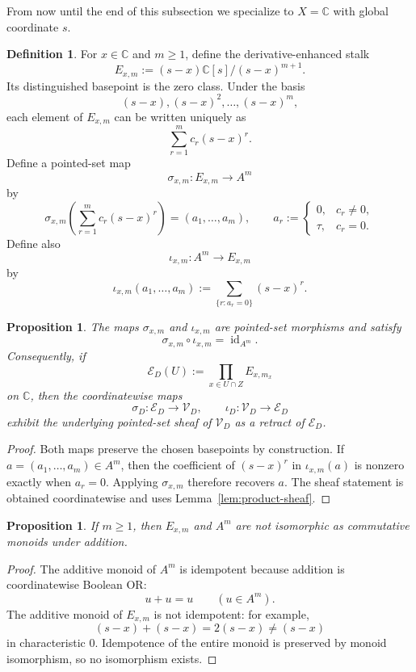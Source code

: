 \documentclass[11pt,a4paper]{article}
\newtheorem{proposition}[theorem]{Proposition}
\theoremstyle{definition}
\newtheorem{definition}[theorem]{Definition}
\theoremstyle{remark}
\newcommand{\CC}{\mathbb C}
\newcommand{\cV}{\mathcal V}
\newcommand{\cE}{\mathcal E}
\newcommand{\taup}{\tau}
\begin{document}
From now until the end of this subsection we specialize to $X=\CC$ with global coordinate $s$.

\begin{definition}
For $x\in\CC$ and $m\ge1$, define the derivative-enhanced stalk
\[
E_{x,m}:=(s-x)\CC[s]/(s-x)^{m+1}.
\]
Its distinguished basepoint is the zero class.  Under the basis
\[
(s-x),(s-x)^2,\dots,(s-x)^m,
\]
each element of $E_{x,m}$ can be written uniquely as
\[
\sum_{r=1}^m c_r(s-x)^r.
\]
Define a pointed-set map
\[
\sigma_{x,m}:E_{x,m}\to A^m
\]
by
\[
\sigma_{x,m}\!\left(\sum_{r=1}^m c_r(s-x)^r\right)=(a_1,\dots,a_m),
\qquad
 a_r:=\begin{cases}0,& c_r\neq0,\\ \taup,& c_r=0.\end{cases}
\]
Define also
\[
\iota_{x,m}:A^m\to E_{x,m}
\]
by
\[
\iota_{x,m}(a_1,\dots,a_m):=\sum_{\{r:a_r=0\}}(s-x)^r.
\]
\end{definition}

\begin{proposition}\label{prop:pointed-retract}
The maps $\sigma_{x,m}$ and $\iota_{x,m}$ are pointed-set morphisms and satisfy
\[
\sigma_{x,m}\circ\iota_{x,m}=\operatorname{id}_{A^m}.
\]
Consequently, if
\[
\cE_D(U):=\prod_{x\in U\cap Z}E_{x,m_x}
\]
on $\CC$, then the coordinatewise maps
\[
\sigma_D:\cE_D\to\cV_D,
\qquad
\iota_D:\cV_D\to\cE_D
\]
exhibit the underlying pointed-set sheaf of $\cV_D$ as a retract of $\cE_D$.
\end{proposition}

\begin{proof}
Both maps preserve the chosen basepoints by construction.  If $a=(a_1,\dots,a_m)\in A^m$, then the coefficient of $(s-x)^r$ in $\iota_{x,m}(a)$ is nonzero exactly when $a_r=0$.  Applying $\sigma_{x,m}$ therefore recovers $a$.  The sheaf statement is obtained coordinatewise and uses Lemma~\ref{lem:product-sheaf}.
\end{proof}

\begin{proposition}\label{prop:not-cmon-iso}
If $m\ge1$, then $E_{x,m}$ and $A^m$ are not isomorphic as commutative monoids under addition.
\end{proposition}

\begin{proof}
The additive monoid of $A^m$ is idempotent because addition is coordinatewise Boolean OR:
\[
u+u=u\qquad (u\in A^m).
\]
The additive monoid of $E_{x,m}$ is not idempotent: for example,
\[
(s-x)+(s-x)=2(s-x)\neq (s-x)
\]
in characteristic $0$.  Idempotence of the entire monoid is preserved by monoid isomorphism, so no isomorphism exists.
\end{proof}
\end{document}
